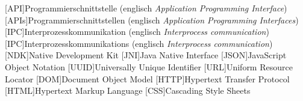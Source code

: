 
\begin{acronym}
  [API]{Programmierschnittstelle (englisch \textit{Application Programming Interface})}
  [APIs]{Programmierschnittstellen (englisch \textit{Application Programming Interfaces})}
  [IPC]{Interprozesskommunikation (englisch \textit{Interprocess communication})}
  [IPC]{Interprozesskommunikations (englisch \textit{Interprocess communication})}
  [NDK]{Native Development Kit}
  [JNI]{Java Native Interface}
  [JSON]{JavaScript Object Notation}
  [UUID]{Universally Unique Identifier}
  [URL]{Uniform Resource Locator}
  [DOM]{Document Object Model}
  [HTTP]{Hypertext Transfer Protocol}
  [HTML]{Hypertext Markup Language}
  [CSS]{Cascading Style Sheets}
\end{acronym}
